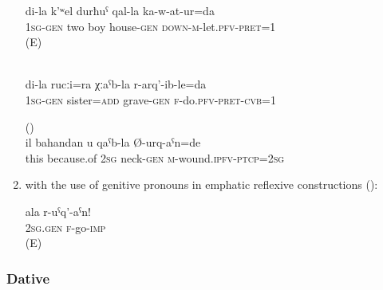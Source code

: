 \begin{enumerate}
\begin{exe}
\begin{xlist}
			\ex	\label{ex:I married off my two sons}
			\gll	di-la k'ʷel durħuˁ qal-la ka-w-at-ur=da\\
				1\textsc{sg}-\textsc{gen}	two	boy	house-\textsc{gen}	\textsc{down-m}-let.\textsc{pfv}-\textsc{pret}=1\\
			\glt	{} (E)
		\end{xlist}

		\ex	{}  \label{ex:(I) buried my sister}\\
		\gll	di-la	rucːi=ra	χːaˁb-la	r-arq'-ib-le=da\\
			1\textsc{sg}-\textsc{gen}	sister=\textsc{add}	grave-\textsc{gen}	\textsc{f}-do.\textsc{pfv}-\textsc{pret}-\textsc{cvb}=1\\
		\glt	{}

		\ex	{} ()  \label{ex:Because of this you (masc.) will be beheaded}\\
		\gll	il	bahandan	u	qaˁb-la	Ø-urq-aˁn=de\\
			this	because.of	2\textsc{sg}	neck-\textsc{gen}	\textsc{m}-wound.\textsc{ipfv}-\textsc{ptcp}=2\textsc{sg}\\
		\glt	{}
	\end{exe}

	\item	with the use of genitive pronouns in emphatic reflexive constructions ():
	\begin{exe}
		\ex	\label{ex:(You) yourself go away}
		\gll	ala	r-uˁq'-aˁn!\\
			2\textsc{sg}.\textsc{gen}	\textsc{f}-go-\textsc{imp}\\
		\glt	{} (E)
	\end{exe}
\end{enumerate}



\subsubsection{Dative}
\label{sssec:Dative}

